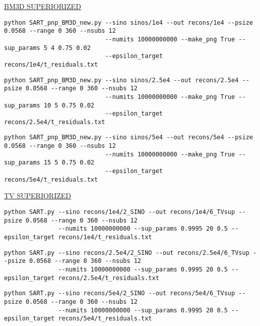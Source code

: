 \documentclass[sigconf,twocolumn,nonacm=true]{acmart}
\begin{document}
\begin{figure*}[h]
\large\begin{center}\underline{BM3D SUPERIORIZED}\end{center}\smallskip\normalsize
\begin{verbatim}
python SART_pnp_BM3D_new.py --sino sinos/1e4 --out recons/1e4 --psize 0.0568 --range 0 360 --nsubs 12
                            --numits 10000000000 --make_png True --sup_params 5 4 0.75 0.02
                            --epsilon_target recons/1e4/t_residuals.txt
\end{verbatim}\smallskip
\begin{verbatim}
python SART_pnp_BM3D_new.py --sino sinos/2.5e4 --out recons/2.5e4 --psize 0.0568 --range 0 360 --nsubs 12
                            --numits 10000000000 --make_png True --sup_params 10 5 0.75 0.02
                            --epsilon_target recons/2.5e4/t_residuals.txt
\end{verbatim}\smallskip
\begin{verbatim}
python SART_pnp_BM3D_new.py --sino sinos/5e4 --out recons/5e4 --psize 0.0568 --range 0 360 --nsubs 12
                            --numits 10000000000 --make_png True --sup_params 15 5 0.75 0.02
                            --epsilon_target recons/5e4/t_residuals.txt
\end{verbatim}\bigskip

\large\begin{center}\underline{TV SUPERIORIZED}\end{center}\smallskip\normalsize
\begin{verbatim}
python SART.py --sino recons/1e4/2_SINO --out recons/1e4/6_TVsup --psize 0.0568 --range 0 360 --nsubs 12
               --numits 10000000000 --sup_params 0.9995 20 0.5 --epsilon_target recons/1e4/t_residuals.txt
\end{verbatim}\smallskip
\begin{verbatim}
python SART.py --sino recons/2.5e4/2_SINO --out recons/2.5e4/6_TVsup --psize 0.0568 --range 0 360 --nsubs 12 
               --numits 10000000000 --sup_params 0.9995 20 0.5 --epsilon_target recons/2.5e4/t_residuals.txt
\end{verbatim}\smallskip
\begin{verbatim}
python SART.py --sino recons/5e4/2_SINO --out recons/5e4/6_TVsup --psize 0.0568 --range 0 360 --nsubs 12 
               --numits 10000000000 --sup_params 0.9995 20 0.5 --epsilon_target recons/5e4/t_residuals.txt
\end{verbatim}\bigskip


\end{figure*}
\end{document}
